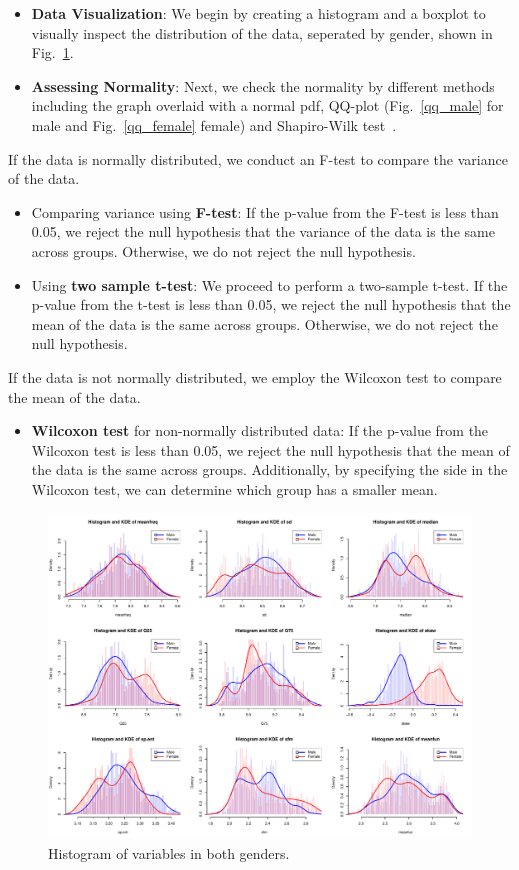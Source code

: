 \documentclass{article}
\begin{document}
	\begin{itemize}
		\item \textbf{Data Visualization}: We begin by creating a histogram and a boxplot to visually inspect the distribution of the data, seperated by gender, shown in Fig.~\ref{hist_bothgender}.
		\item \textbf{Assessing Normality}: Next, we check the normality by different methods including the graph overlaid with a normal pdf, QQ-plot (Fig.~\ref{qq_male} for male and Fig.~\ref{qq_female} female) and Shapiro-Wilk test~\cite{shapiro1965analysis}.
	\end{itemize}
	If the data is normally distributed, we conduct an F-test to compare the variance of the data.
	\begin{itemize}
		\item Comparing variance using \textbf{F-test}: If the p-value from the F-test is less than 0.05, we reject the null hypothesis that the variance of the data is the same across groups. Otherwise, we do not reject the null hypothesis.
		\item Using \textbf{two sample t-test}: We proceed to perform a two-sample t-test. If the p-value from the t-test is less than 0.05, we reject the null hypothesis that the mean of the data is the same across groups. Otherwise, we do not reject the null hypothesis.
	\end{itemize}
	If the data is not normally distributed, we employ the Wilcoxon test to compare the mean of the data.
	\begin{itemize}
		\item \textbf{Wilcoxon test} for non-normally distributed data: If the p-value from the Wilcoxon test is less than 0.05, we reject the null hypothesis that the mean of the data is the same across groups. Additionally, by specifying the side in the Wilcoxon test, we can determine which group has a smaller mean.
	\end{itemize}
	\begin{figure}
		\centering
		\includegraphics[width=\textwidth]{graphs/gender/visualizations.pdf}
		\caption{Histogram of variables in both genders.}
		\label{hist_bothgender}
	\end{figure}
\end{document}
